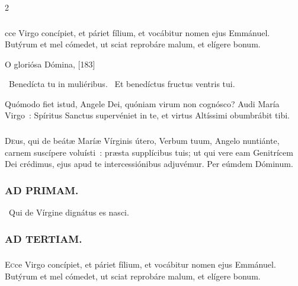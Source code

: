 \documentclass[9pt,twoside]{extarticle}
\begin{document}
\begin{multicols}{2}
{{\subsubsection*{}
cce Virgo concípiet, et páriet fílium, et vocábitur nomen ejus Emmánuel. Butýrum et mel cómedet, ut sciat reprobáre malum, et elígere bonum.

\begin{tightlist}{}
\item {} O gloriósa Dómina,  [183]
\item {}~Benedícta tu in muliéribus. ~Et benedíctus fructus ventris tui.
\item {} Quómodo fiet istud, Angele Dei, quóniam virum non cognósco? Audi María Virgo~: Spíritus Sanctus supervéniet in te, et virtus Altíssimi obumbrábit tibi.
\end{tightlist}

\subsubsection*{\center {}}
\lettrine{D}eus, qui de beátæ Maríæ Vírginis útero, Verbum tuum, Angelo nuntiánte, carnem suscípere voluísti~: præsta supplícibus tuis; ut qui vere eam Genitrícem Dei crédimus, ejus apud te intercessiónibus adjuvémur. Per eúmdem Dóminum.

\begin{tightlist}{}
\item {}
\end{tightlist}

\subsubsection*{\center \textsc{AD PRIMAM.}}
\noindent {}~Qui de Vírgine dignátus es nasci.

\subsubsection*{\center \textsc{AD TERTIAM.}}
\subsubsection*{}
\lettrine{E}cce Virgo concípiet, et páriet fílium, et vocábitur nomen ejus Emmánuel. Butýrum et mel cómedet, ut sciat reprobáre malum, et elígere bonum.

}}
\end{multicols}
\end{document}
